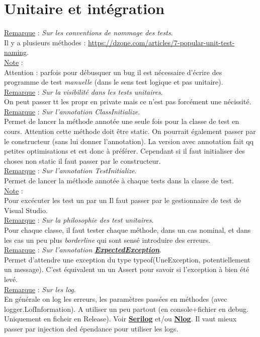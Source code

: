 \documentclass[a4paper,12pt,twoside]{article}
\newcommand{\urlcolor}{magenta}  %
\newcommand{\keycolor}{purple} %
\newcommand{\incode}[1]{{\footnotesize\ttfamily #1}} %
\newcommand{\rem}[2]{\noindent\underline{Remarque} : \textit{#1}.\\ \indent #2}
\newcommand{\note}[1]{\noindent\underline{Note} : \\ \indent #1}
\newcommand{\keyref}[2]{\hypersetup{urlcolor=\keycolor} \href{#1}{\textbf{#2}}\hypersetup{urlcolor=\urlcolor}}
\begin{document}
\section{Unitaire et intégration}

\rem{Sur les conventions de nommage des tests}{Il y a plusieurs méthodes : \url{https://dzone.com/articles/7-popular-unit-test-naming}.}\\

\note{Attention : parfois pour débusquer un bug il est nécessaire d'écrire des programme de test \textit{manuelle} (dans le sens test logique et pas unitaire).}\\

\rem{Sur la visibilité dans les tests unitaires}{On peut passer tt les propr en private mais ce n'est pas forcément une nécissité.}\\

\rem{Sur l'annotation ClassInitialize}{Permet de lancer la méthode annotée une seule fois pour la classe de test en cours. Attention cette méthode doit être static. On pourrait également passer par le constructeur (sans lui donner l'annotation). La version avec annotation fait qq petites optimisations et est donc à préférer. Cependant si il faut initialiser des choses non static il faut passer par le constructeur.}\\

\rem{Sur l'annotation TestInitialize}{Permet de lancer la méthode annotée à chaque tests dans la classe de test.}\\

\note{Pour excécuter les test un par un Il faut passer par le gestionnaire de test de Visual Studio.}\\

\rem{Sur la philosophie des test unitaires}{Pour chaque classe, il faut tester chaque méthode, dans un cas nominal, et dans les cas un peu plus \textit{borderline} qui sont sensé introduire des erreurs.}\\

\rem{Sur l'annotation \keyref{https://docs.microsoft.com/fr-fr/dotnet/api/microsoft.visualstudio.testtools.unittesting.expectedexceptionattribute?view=visualstudiosdk-2022}{ExpectedException}}{Permet d'attendre une exception du type typeof(UneException, potentiellement un message). C'est équivalent un un Assert pour savoir si l'exception à bien été levé.}\\

\rem{Sur les log}{En générale on log les erreurs, les paramètres passées en méthodes (avec \incode{logger.LofInformation}). A utiliser un peu partout (en console+fichier en debug. Uniquement en ficheir en Release). Voir \keyref{https://serilog.net/}{Serilog} et/ou \keyref{https://nlog-project.org/}{Nlog}. Il vaut mieux passer par injection ded épendance pour utiliser les logs.}\\
\end{document}
